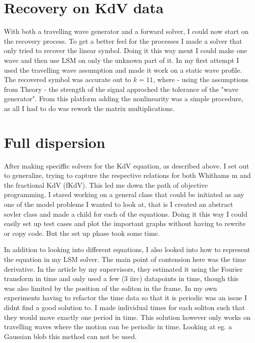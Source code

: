 \section{Recovery on KdV data}
With both a travelling wave generator and a forward solver, I could now start on the recovery process. 
To get a better feel for the processes I made a solver that only tried to recover the linear symbol. 
Doing it this way ment I could make one wave and then use LSM on only the unknown part of it.
In my first attempt I used the travelling wave assumption and made it work on a static wave profile.
The recovered symbol was accurate out to $k = 11$, where - using the assumptions from Theory - the strength of the signal approched the tolerance of the "wave generator".
From this platform adding the nonlinearity was a simple procedure, as all I had to do was rework the matrix multiplications. 


\section{Full dispersion}
After making speciffic solvers for the KdV equation, as described above. I set out to generalize, trying to capture the respective relations for 
both Whithams m and the fractional KdV (fKdV). This led me down the path of objective programming. I stared working on a general class that could be 
initiated as any one of the model problems I wanted to look at, that is I created an abstract sovler class and made a child for each of the equations. 
Doing it this way I could easily set up test cases and plot the important graphs without having to rewrite or copy code. 
But the set up phase took some time. 

In addition to looking into different equations, I also looked into how to represent the equation in my LSM solver.
The main point of contension here was the time derivative. In the article by my supervisors, they estimated it using the Fourier transform in time 
and only used a few (3 iirc) datapoints in time, though this was also limited by the position of the soliton in the frame. 
In my own experiments having to refactor the time data so that it is periodic was an issue I didnt find a good solution to. 
I made individual times for each soliton such that they would move exactly one period in time. This solution however only works 
on travelling waves where the motion can be periodic in time. Looking at eg. a Gaussian blob this method can not be used. 